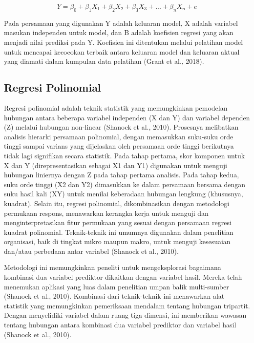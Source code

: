 \begin{equation}
  \label{eq:RumusRegresiLinearBerganda}
  Y = \beta_0 + \beta_1 X_1 + \beta_2 X_2 + \beta_3 X_3 + ... + \beta_n X_n + e
\end{equation}

Pada persamaan yang digunakan Y adalah keluaran model, X adalah variabel masukan independen untuk model, dan B adalah koefisien regresi yang akan menjadi nilai prediksi pada Y. Koefisien ini ditentukan melalui pelatihan model untuk mencapai kecocokan terbaik antara keluaran model dan keluaran aktual yang diamati dalam kumpulan data pelatihan (Grant et al., 2018).

\subsection{Regresi Polinomial}
\label{subsec:regresipolinomial}

Regresi polinomial adalah teknik statistik yang memungkinkan pemodelan hubungan antara beberapa variabel independen (X dan Y) dan variabel dependen (Z) melalui hubungan non-linear (Shanock et al., 2010). Prosesnya melibatkan analisis hierarki persamaan polinomial, dengan memasukkan suku-suku orde tinggi sampai varians yang dijelaskan oleh persamaan orde tinggi berikutnya tidak lagi signifikan secara statistik. Pada tahap pertama, skor komponen untuk X dan Y (direpresentasikan sebagai X1 dan Y1) digunakan untuk menguji hubungan liniernya dengan Z pada tahap pertama analisis. Pada tahap kedua, suku orde tinggi (X2 dan Y2) dimasukkan ke dalam persamaan bersama dengan suku hasil kali (XY) untuk menilai keberadaan hubungan lengkung (khususnya, kuadrat). Selain itu, regresi polinomial, dikombinasikan dengan metodologi permukaan respons, menawarkan kerangka kerja untuk menguji dan menginterpretasikan fitur permukaan yang sesuai dengan persamaan regresi kuadrat polinomial. Teknik-teknik ini umumnya digunakan dalam penelitian organisasi, baik di tingkat mikro maupun makro, untuk menguji kesesuaian dan/atau perbedaan antar variabel (Shanock et al., 2010).

Metodologi ini memungkinkan peneliti untuk mengeksplorasi bagaimana kombinasi dua variabel prediktor dikaitkan dengan variabel hasil. Mereka telah menemukan aplikasi yang luas dalam penelitian umpan balik multi-sumber (Shanock et al., 2010). Kombinasi dari teknik-teknik ini menawarkan alat statistik yang memungkinkan pemeriksaan mendalam tentang hubungan tripartit. Dengan menyelidiki variabel dalam ruang tiga dimensi, ini memberikan wawasan tentang hubungan antara kombinasi dua variabel prediktor dan variabel hasil (Shanock et al., 2010).

